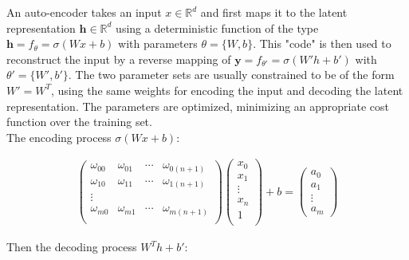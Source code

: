 \documentclass[final, paper=letter,5p,times,twocolumn]{elsarticle}
\begin{document}
An auto-encoder takes an input $x \in \mathbb{R}^{d}$ and first maps it to the latent representation $\bm{h} \in \mathbb{R}^{d}$ using a deterministic function of the type $\bm{h} = f_{\theta} = \sigma(Wx + b)$ with parameters $\theta = \{W, b\}$. This "code" is then used to reconstruct the input by a reverse mapping of $\bm{y} = f_{\theta'} = \sigma( W'h + b')$ with $\theta' = \{W', b'\}$. The two parameter sets are usually constrained to be of the form $W' = W^{T}$, using the same weights for encoding the input and decoding the latent representation. The parameters are optimized, minimizing an appropriate cost function over the training set.\\
The encoding process $\sigma(Wx + b)$: 

\begin{eqnarray*}
  \left(
  \begin{array}{cccc}
    \omega_{00} & \omega_{01} & \cdots & \omega_{0(n+1)} \\
    \omega_{10} & \omega_{11} & \cdots & \omega_{1(n+1)} \\
    \vdots \\
    \omega_{m0} & \omega_{m1} & \cdots & \omega_{m(n+1)} \\
  \end{array}
  \right) \left(
  \begin{array}{c}
    x_{0} \\
    x_{1} \\
    \vdots \\
    x_{n} \\
    1 \\
  \end{array}
  \right) + b = \left(
  \begin{array}{c}
    a_{0} \\
    a_{1} \\
    \vdots \\
    a_{m} 
  \end{array}
  \right)
\end{eqnarray*}

Then the decoding process $W^{T}h + b'$:
\end{document}
